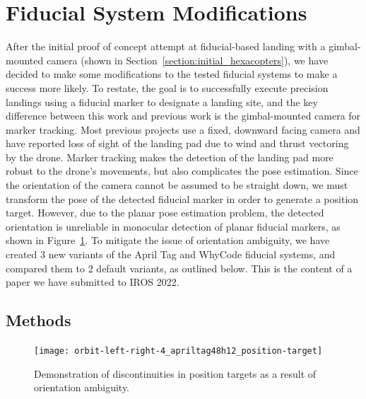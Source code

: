 \section{Fiducial System Modifications}
\label{section:fiducial_system_modifications}

After the initial proof of concept attempt at fiducial-based landing with a gimbal-mounted camera (shown in Section~\ref{section:initial_hexacopters}),
we have decided to make some modifications to the tested fiducial systems to make a success more likely.
To restate, the goal is to successfully execute precision landings using a fiducial marker to designate a landing site,
and the key difference between this work and previous work is the gimbal-mounted camera for marker tracking.
Most previous projects use a fixed, downward facing camera and have reported loss of sight of the landing pad due to
wind and thrust vectoring by the drone.
Marker tracking makes the detection of the landing pad more robust to the drone's movements,
but also complicates the pose estimation.
Since the orientation of the camera cannot be assumed to be straight down,
we must transform the pose of the detected fiducial marker in order to generate a position target.
However, due to the planar pose estimation problem, the detected orientation is unreliable in monocular detection of planar fiducial markers,
as shown in Figure~\ref{figure:discontinuities}.
To mitigate the issue of orientation ambiguity, we have created 3 new variants of the April Tag and WhyCode fiducial systems,
and compared them to 2 default variants, as outlined below.
This is the content of a paper we have submitted to IROS 2022.

\subsection{Methods}

\begin{figure}
    \centering
    \texttt{[image: orbit-left-right-4\_apriltag48h12\_position-target]}
    \caption{Demonstration of discontinuities in position targets as a result of orientation ambiguity.}
    \label{figure:discontinuities}
\end{figure}

